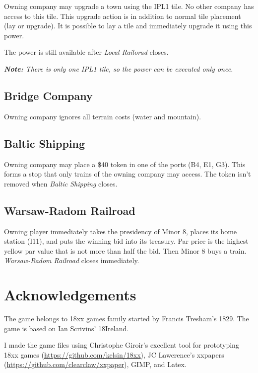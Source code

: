 \documentclass[10pt,a4paper,twocolumn]{article}
\begin{document}
Owning company may upgrade a town using the IPL1 tile. No other company has access to this tile. This upgrade action is in addition to normal tile placement (lay or upgrade). It is possible to lay a tile and immediately upgrade it using this power. 

The power is still available after \textit{Local Railorad} closes.

\textit{\textbf{Note:} There is only one IPL1 tile, so the power can be executed only once.}

\subsection{Bridge Company}

Owning company ignores all terrain costs (water and mountain).

\subsection{Baltic Shipping}

Owning company may place a \$40 token in one of the ports (B4, E1, G3). This forms a stop that only trains of the owning company may access. The token isn't removed when \textit{Baltic Shipping} closes.

\subsection{Warsaw-Radom Railroad}

Owning player immediately takes the presidency of Minor 8, places its home station (I11), and puts the winning bid into its treasury. Par price is the highest yellow par value that is not more than half the bid. Then Minor 8 buys a train. \textit{Warsaw-Radom Railroad} closes immediately.

\section{Acknowledgements}

The game belongs to 18xx games family started by Francis Tresham's 1829. The game is based on Ian Scrivins' 18Ireland.

I made the game files using Christophe Giroir's excellent tool for prototyping 18xx games (\url{https://github.com/kelsin/18xx}), JC Lawerence's xxpapers (\url{https://github.com/clearclaw/xxpaper}), GIMP, and Latex.
\end{document}
